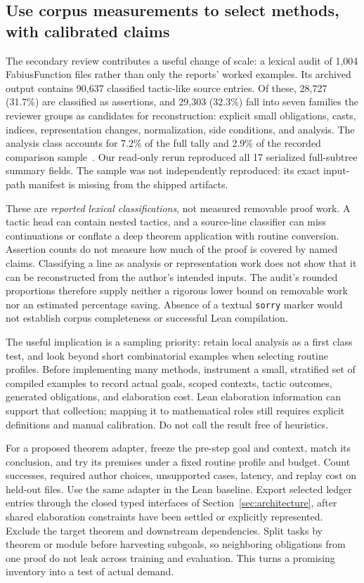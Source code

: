 \documentclass[11pt,letterpaper]{article}
\newcommand{\code}[1]{\nolinkurl{#1}}
\begin{document}
\subsection{Use corpus measurements to select methods, with calibrated claims}\label{sec:audit}
The secondary review contributes a useful change of scale: a lexical audit of
1,004 FabiusFunction files rather than only the reports' worked examples. Its
archived output contains 90,637 classified tactic-like source entries. Of these,
28,727 (31.7\%) are classified as assertions, and 29,303 (32.3\%) fall into seven
families the reviewer groups as candidates for reconstruction: explicit small
obligations, casts, indices, representation changes, normalization, side conditions,
and analysis. The analysis class accounts for 7.2\% of the full tally and 2.9\%
of the recorded comparison sample~\cite[\S3]{secondary}.
Our read-only rerun reproduced all 17 serialized full-subtree summary fields.
The sample was not independently reproduced: its exact input-path manifest is
missing from the shipped artifacts.

These are \emph{reported lexical classifications}, not measured removable proof
work. A tactic head can contain nested tactics, and a source-line classifier can
miss continuations or conflate a deep theorem application with routine conversion.
Assertion counts do not measure how much of the proof is covered by named claims.
Classifying a line as analysis or representation work does not show that it can
be reconstructed from the author's intended inputs. The audit's rounded
proportions therefore supply neither a rigorous lower bound on removable work
nor an estimated percentage saving. Absence of a textual \code{sorry} marker
would not establish corpus completeness or successful Lean compilation.

The useful implication is a sampling priority: retain local analysis as a first
class test, and look beyond short combinatorial examples when selecting routine
profiles. Before implementing many methods, instrument a small, stratified set
of compiled examples to record actual goals, scoped contexts, tactic outcomes,
generated obligations, and elaboration cost. Lean elaboration information can
support that collection; mapping it to mathematical roles still requires explicit
definitions and manual calibration. Do not call the result free of heuristics.

For a proposed theorem adapter, freeze the pre-step goal and context, match its
conclusion, and try its premises under a fixed routine profile and budget. Count
successes, required author choices, unsupported cases, latency, and replay cost on
held-out files. Use the same adapter in the Lean baseline. Export selected ledger
entries through the closed typed interfaces of Section~\ref{sec:architecture},
after shared elaboration constraints have been settled or explicitly represented.
Exclude the target theorem and downstream dependencies. Split tasks by theorem or
module before harvesting
subgoals, so neighboring obligations from one proof do not leak across training
and evaluation. This turns a promising inventory into a test of actual demand.
\end{document}
